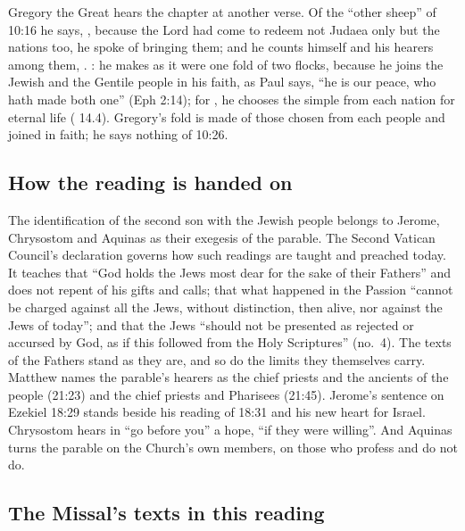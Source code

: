 Gregory the Great hears the chapter at another verse. Of the ``other sheep''
of 10:16 he says, , because the Lord had come to redeem not Judaea only but the
nations too, he spoke of bringing them; and he counts himself and his hearers
among them, . : he makes as it were one fold of two flocks, because he joins the
Jewish and the Gentile people in his faith, as Paul says, ``he is our peace,
who hath made both one'' (Eph 2:14); for , he chooses the simple from each nation for eternal
life ( 14.4). Gregory's fold is made of those
chosen from each people and joined in faith; he says nothing of 10:26.

\subsection{How the reading is handed on}

The identification of the second son with the Jewish people belongs to
Jerome, Chrysostom and Aquinas as their exegesis of the parable. The Second
Vatican Council's declaration  governs how such readings are
taught and preached today. It teaches that ``God holds the Jews most dear for
the sake of their Fathers'' and does not repent of his gifts and calls; that
what happened in the Passion ``cannot be charged against all the Jews, without
distinction, then alive, nor against the Jews of today''; and that the Jews
``should not be presented as rejected or accursed by God, as if this followed
from the Holy Scriptures'' (no.~4). The texts of the Fathers stand as they
are, and so do the limits they themselves carry. Matthew names the parable's
hearers as the chief priests and the ancients of the people (21:23) and the
chief priests and Pharisees (21:45). Jerome's sentence on Ezekiel 18:29 stands
beside his reading of 18:31  and his new heart for
Israel. Chrysostom hears in ``go before you'' a hope, ``if they were willing''.
And Aquinas turns the parable on the Church's own members, on those who profess
and do not do.

\subsection{The Missal's texts in this reading}

